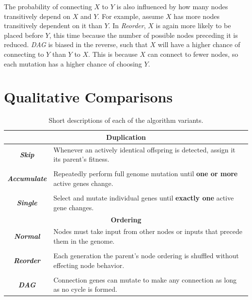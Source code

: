 \documentclass[journal]{IEEEtran}
\begin{document}
The probability of connecting $X$ to $Y$ is also influenced by how many nodes transitively depend on $X$ and $Y$.
For example, assume $X$ has more nodes transitively dependent on it than $Y$.
In \emph{Reorder}, $X$ is again more likely to be placed before $Y$, this time because the number
of possible nodes preceding it is reduced.  \emph{DAG} is biased in the reverse, such that $X$ will
have a higher chance of connecting to $Y$ than $Y$ to $X$.  This is because $X$ can connect to fewer
nodes, so each mutation has a higher chance of choosing $Y$.

\section{Qualitative Comparisons}
\label{sec:quality}

\begin{table}
	\centering
	\caption{Short descriptions of each of the algorithm variants.}
	\begin{tabular}{|c|p{6cm}|}
	\hline
  \multicolumn{2}{|c|}{\textbf{Duplication}} \\ \hline
	\textbf{\emph{Skip}} & Whenever an actively identical offspring is detected, assign it its parent's fitness. \\ & \\
	\textbf{\emph{Accumulate}} & Repeatedly perform full genome mutation until \textbf{one or more} active genes change. \\ & \\
	\textbf{\emph{Single}} & Select and mutate individual genes until \textbf{exactly one} active gene changes. \\
	\hline \multicolumn{2}{|c|}{\textbf{Ordering}} \\ \hline
	\textbf{\emph{Normal}} & Nodes must take input from other nodes or inputs that precede them in the genome. \\ & \\
	\textbf{\emph{Reorder}} & Each generation the parent's node ordering is shuffled without effecting node behavior. \\ & \\
	\textbf{\emph{DAG}} & Connection genes can mutate to make any connection as long as no cycle is formed. \\
	  \hline
	\end{tabular}
	\label{tab:glossary}
\end{table}

\end{document}

